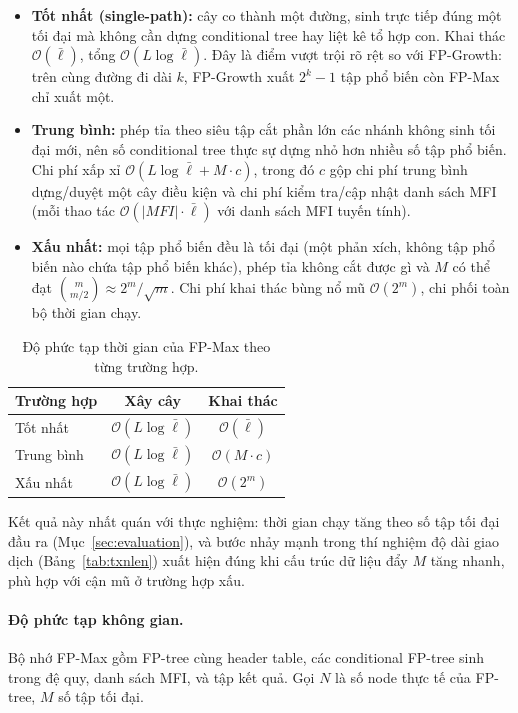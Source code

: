 \begin{itemize}
  \item \textbf{Tốt nhất (single-path):} cây co thành một đường, sinh trực tiếp đúng một tối đại mà không cần dựng conditional tree hay liệt kê tổ hợp con. Khai thác $\mathcal{O}(\bar{\ell})$, tổng $\mathcal{O}(L\log\bar{\ell})$. Đây là điểm vượt trội rõ rệt so với FP-Growth: trên cùng đường đi dài $k$, FP-Growth xuất $2^k-1$ tập phổ biến còn FP-Max chỉ xuất một.
  \item \textbf{Trung bình:} phép tỉa theo siêu tập cắt phần lớn các nhánh không sinh tối đại mới, nên số conditional tree thực sự dựng nhỏ hơn nhiều số tập phổ biến. Chi phí xấp xỉ $\mathcal{O}(L\log\bar{\ell} + M\cdot c)$, trong đó $c$ gộp chi phí trung bình dựng/duyệt một cây điều kiện và chi phí kiểm tra/cập nhật danh sách MFI (mỗi thao tác $\mathcal{O}(|MFI|\cdot\bar{\ell})$ với danh sách MFI tuyến tính).
  \item \textbf{Xấu nhất:} mọi tập phổ biến đều là tối đại (một phản xích, không tập phổ biến nào chứa tập phổ biến khác), phép tỉa không cắt được gì và $M$ có thể đạt $\binom{m}{m/2}\approx 2^m/\sqrt{m}$. Chi phí khai thác bùng nổ mũ $\mathcal{O}(2^m)$, chi phối toàn bộ thời gian chạy.
\end{itemize}

\begin{table}[H]
  \centering
  \caption{Độ phức tạp thời gian của FP-Max theo từng trường hợp.}
  \label{tab:time-complexity}
  \begin{tabular}{lcc}
    \toprule
    Trường hợp & Xây cây & Khai thác \\
    \midrule
    Tốt nhất    & $\mathcal{O}(L\log\bar{\ell})$ & $\mathcal{O}(\bar{\ell})$ \\
    Trung bình  & $\mathcal{O}(L\log\bar{\ell})$ & $\mathcal{O}(M\cdot c)$ \\
    Xấu nhất    & $\mathcal{O}(L\log\bar{\ell})$ & $\mathcal{O}(2^m)$ \\
    \bottomrule
  \end{tabular}
\end{table}

Kết quả này nhất quán với thực nghiệm: thời gian chạy tăng theo số tập tối đại đầu ra (Mục~\ref{sec:evaluation}), và bước nhảy mạnh trong thí nghiệm độ dài giao dịch (Bảng~\ref{tab:txnlen}) xuất hiện đúng khi cấu trúc dữ liệu đẩy $M$ tăng nhanh, phù hợp với cận mũ ở trường hợp xấu.

\paragraph{Độ phức tạp không gian.}
Bộ nhớ FP-Max gồm FP-tree cùng header table, các conditional FP-tree sinh trong đệ quy, danh sách MFI, và tập kết quả. Gọi $N$ là số node thực tế của FP-tree, $M$ số tập tối đại.

